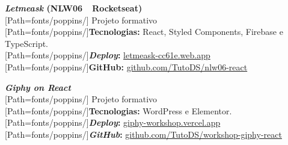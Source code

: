 \vspace{10pt}

\begin{minipage}[t]{.4\textwidth}
\textbf{\textit{Letmeask} {\footnotesize(NLW06~\textemdash~Rocketseat)}}\\
{
	\scriptsize
	[Path=fonts/poppins/]
	Projeto formativo\\
	{[Path=fonts/poppins/]\textbf{Tecnologias:}} React, Styled Components, Firebase e TypeScript.\\
	{[Path=fonts/poppins/]\textbf{\textit{Deploy}:}} \href{https://letmeask-cc61e.web.app/}{letmeask-cc61e.web.app}\\
	{[Path=fonts/poppins/]\textbf{GitHub:}} \href{https://github.com/TutoDS/nlw06-react}{github.com/TutoDS/nlw06-react}
}
\end{minipage}\hspace{0.1\textwidth}
\begin{minipage}[t]{.4\textwidth}
\textbf{\textit{Giphy on React}}\\
{
	\scriptsize
	[Path=fonts/poppins/]
	Projeto formativo\\
	{[Path=fonts/poppins/]\textbf{Tecnologias:}} WordPress e Elementor.\\
	{[Path=fonts/poppins/]\textbf{\textit{Deploy}:}} \href{https://giphy-workshop.vercel.app}{giphy-workshop.vercel.app}\\
	{[Path=fonts/poppins/]\textbf{\textit{GitHub}:}} \href{https://github.com/TutoDS/workshop-giphy-react}{github.com/TutoDS/workshop-giphy-react}\\
}
\end{minipage}

\vspace{5pt}